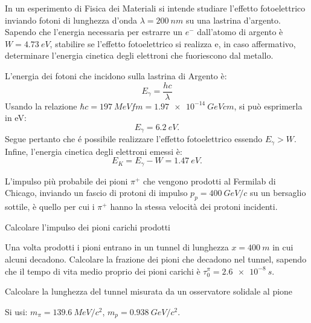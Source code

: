 \begin{Exercise}[title={Effetto fotoelettrico, unit\`a di misura}]
In un esperimento di Fisica dei Materiali si intende studiare l'effetto 
fotoelettrico inviando fotoni di lunghezza d'onda $\lambda=\SI{200}{nm}$ su una 
lastrina d'argento. Sapendo che l'energia necessaria per estrarre un $e^-$ 
dall'atomo di argento \`e $W=\SI{4.73}{eV}$, stabilire se l'effetto fotoelettrico 
si realizza e, in caso affermativo,  determinare l'energia cinetica degli 
elettroni che fuoriescono dal metallo.
\end{Exercise}
\begin{Answer}
  L'energia dei fotoni che incidono sulla lastrina di Argento \`e:
  \[
  E_\gamma = \frac{h c}{\lambda}
  \]
  Usando la relazione $\hbar c = \SI{197}{MeV fm} = \SI{1.97e-14}{GeV cm}$, si pu\`o esprimerla in eV:
  \[
  E_\gamma = \SI{6.2}{eV}.
  \]
  Segue pertanto  che \'e possibile realizzare l'effetto fotoelettrico essendo $E_\gamma>W$. 
  Infine, l'energia cinetica degli elettroni emessi \`e:
  \[
  E_K = E_\gamma-W = \SI{1.47}{eV}.
  \]
\end{Answer}

\begin{Exercise}[title={Cinematica relativistica, decadimento di particelle}]
L'impulso pi\`u probabile dei pioni $\pi^+$ che vengono prodotti al
Fermilab di Chicago, inviando un fascio di protoni di impulso
$p_p=\SI{400}{GeV/c}$ su un bersaglio sottile, \`e quello per cui i
$\pi^+$ hanno la stessa velocit\`a dei protoni incidenti.

\Question Calcolare l'impulso dei pioni carichi prodotti

\Question Una volta prodotti i pioni entrano in un tunnel di lunghezza
$x=\SI{400}{m}$ in cui alcuni decadono.  Calcolare la frazione dei
pioni che decadono nel tunnel, sapendo che il tempo di vita medio
proprio dei pioni carichi \`e $\tau_0^\pi=\SI{2.6e-8}{s}$.

\Question Calcolare la lunghezza del tunnel misurata da un osservatore
solidale al pione

Si usi: $m_\pi=\SI{139.6}{MeV/c^2}$, $m_p=\SI{0.938}{GeV/c^2}$.
\end{Exercise}

